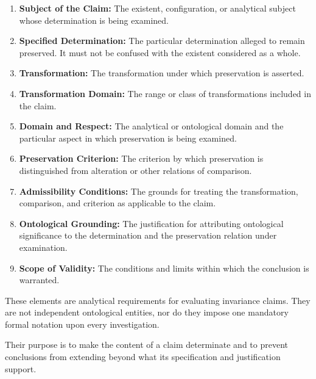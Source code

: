\begin{enumerate}
    \item \textbf{Subject of the Claim:}
          The existent, configuration, or analytical
          subject whose determination is being examined.

    \item \textbf{Specified Determination:}
          The particular determination alleged to remain
          preserved. It must not be confused with the
          existent considered as a whole.

    \item \textbf{Transformation:}
          The transformation under which preservation
          is asserted.

    \item \textbf{Transformation Domain:}
          The range or class of transformations included
          in the claim.

    \item \textbf{Domain and Respect:}
          The analytical or ontological domain and the
          particular aspect in which preservation is
          being examined.

    \item \textbf{Preservation Criterion:}
          The criterion by which preservation is
          distinguished from alteration or other
          relations of comparison.

    \item \textbf{Admissibility Conditions:}
          The grounds for treating the transformation,
          comparison, and criterion as applicable to
          the claim.

    \item \textbf{Ontological Grounding:}
          The justification for attributing ontological
          significance to the determination and the
          preservation relation under examination.

    \item \textbf{Scope of Validity:}
          The conditions and limits within which the
          conclusion is warranted.
\end{enumerate}

These elements are analytical requirements for
evaluating invariance claims. They are not independent
ontological entities, nor do they impose one mandatory
formal notation upon every investigation.

Their purpose is to make the content of a claim
determinate and to prevent conclusions from extending
beyond what its specification and justification
support.

